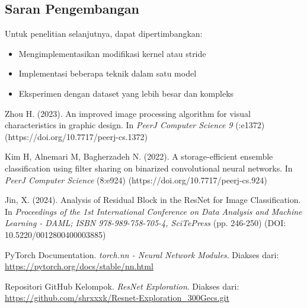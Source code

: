 \documentclass[11pt,a4paper]{article}
\begin{document}
\subsection{Saran Pengembangan}

Untuk penelitian selanjutnya, dapat dipertimbangkan:

\begin{itemize}
    \item Mengimplementasikan modifikasi kernel atau stride
    \item Implementasi beberapa teknik dalam satu model
    \item Eksperimen dengan dataset yang lebih besar dan kompleks
\end{itemize}

\newpage

\begin{thebibliography}{9}

Zhou H. (2023). An improved image processing algorithm for visual characteristics in graphic design. In \textit{PeerJ Computer Science 9} (:e1372) (https://doi.org/10.7717/peerj-cs.1372)

Kim H, Alnemari M, Bagherzadeh N. (2022). A storage-efficient ensemble classification using filter sharing on binarized convolutional neural networks. In \textit{PeerJ Computer Science} (8:e924) (https://doi.org/10.7717/peerj-cs.924)

Jin, X. (2024). Analysis of Residual Block in the ResNet for Image Classification. In \textit{Proceedings of the 1st International Conference on Data Analysis and Machine Learning - DAML; ISBN 978-989-758-705-4, SciTePress} (pp. 246-250) (DOI: 10.5220/0012800400003885)


PyTorch Documentation. \textit{torch.nn - Neural Network Modules}. Diakses dari: \url{https://pytorch.org/docs/stable/nn.html}

Repositori GitHub Kelompok. \textit{ResNet Exploration}. Diakses dari: \url{https://github.com/shrxxxk/Resnet-Exploration_300Gecs.git}

\end{thebibliography}
\end{document}
